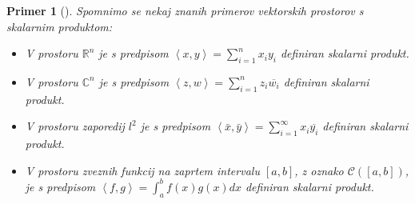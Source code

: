 \documentclass[12pt,a4paper,oneside,fleqn,openany]{book}
\newtheorem{primer*}[izrek]{Primer}
\newenvironment{primer}[1][]{\begin{primer*}[#1]\renewcommand*{\qedsymbol}{$\diamondsuit$}\pushQED{\qed}}{\popQED\end{primer*}}
\newcommand{\R}{\mathbb{R}}
\newcommand{\C}{\mathbb{C}}
\newcommand{\Sp}[2]{\ensuremath{\left<#1, #2\right>}}
\begin{document}
\begin{primer}
	\label{prim:ScalProd}
	Spomnimo se nekaj znanih primerov vektorskih prostorov s skalarnim produktom: \begin{itemize}
		\item V prostoru $\R^n$ je s predpisom $\Sp{x}{y} = \displaystyle\sum_{i = 1}^{n}x_iy_i$ definiran skalarni produkt.
		\item V prostoru $\C^n$ je s predpisom $\Sp{z}{w} = \displaystyle\sum_{i = 1}^{n}z_i\overline{w_i}$ definiran skalarni produkt.
		\item V prostoru zaporedij $l^2$ je s predpisom $\Sp{\bar{x}}{\bar{y}} = \displaystyle\sum_{i = 1}^{\infty}x_i\overline{y_i}$ definiran skalarni produkt.
		\item V prostoru zveznih funkcij na zaprtem intervalu $[a, b]$, z oznako $\mathcal{C}([a, b])$, je s predpisom $\Sp{f}{g} = \int_{a}^{b}f(x)g(x)dx$ definiran skalarni produkt.
	\end{itemize}
\end{primer}
\end{document}
